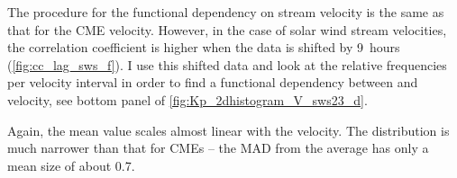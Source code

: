The procedure for the functional dependency on stream velocity is the same as that for the CME velocity. However, in the case of solar wind stream velocities, the correlation coefficient is higher when the data is shifted by 9~hours (\autoref{fig:cc_lag_sws_f}).
I use this shifted data and look at the relative frequencies per velocity interval in order to find a functional dependency between \Kp{} and velocity, see bottom panel of \autoref{fig:Kp_2dhistogram_V_sws23_d}.
\begin{figure}[htb]
\end{figure}
Again, the mean \Kp{} value scales almost linear with the velocity. The distribution is much narrower than that for CMEs -- the MAD from the average \Kp{} has only a mean size of about \num{0.7}.

